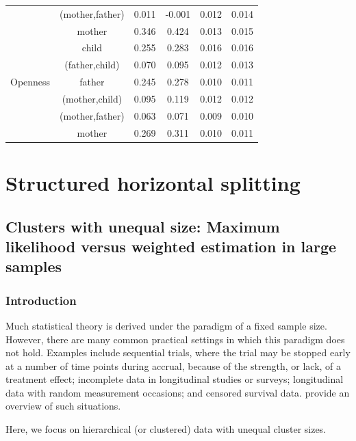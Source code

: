 \documentclass[11pt,a5paper,twoside]{book}
\begin{document}
\begin{table}[ht]
{\begin{tabular}{cccccc}
      &  (mother,father)  & 0.011 & -0.001 & 0.012 & 0.014 \\ 
      &  mother  & 0.346 & 0.424 & 0.013 & 0.015 \\ 
   \hline
  &  child  & 0.255 & 0.283 & 0.016 & 0.016 \\ 
      &  (father,child)  & 0.070 & 0.095 & 0.012 & 0.013 \\ 
    Openness  &  father  & 0.245 & 0.278 & 0.010 & 0.011 \\ 
      &  (mother,child)  & 0.095 & 0.119 & 0.012 & 0.012 \\ 
      &  (mother,father)  & 0.063 & 0.071 & 0.009 & 0.010 \\ 
      &  mother  & 0.269 & 0.311 & 0.010 & 0.011 \\ 
   \hline
\end{tabular}}

\end{table}


\chapter{Structured horizontal splitting}
\label{chap_struc_horiz}
\section[Compound-symmetry structure]{Clusters with unequal size: Maximum likelihood versus weighted estimation in large samples}
\label{sec_cs}
\subsection{Introduction}
\label{secintrocs}

Much statistical theory is derived under the paradigm of a fixed sample size. However, there are many common practical settings in which this paradigm does not hold. Examples include sequential trials, where the trial may be stopped early at a number of time points during accrual, because of the strength, or lack, of a treatment effect; incomplete data in longitudinal studies or surveys; longitudinal data with random measurement occasions; and censored survival data.
\cite{molenberghs2014random} provide an overview of such situations.

Here, we focus on hierarchical (or clustered) data with unequal cluster sizes.
\end{document}
